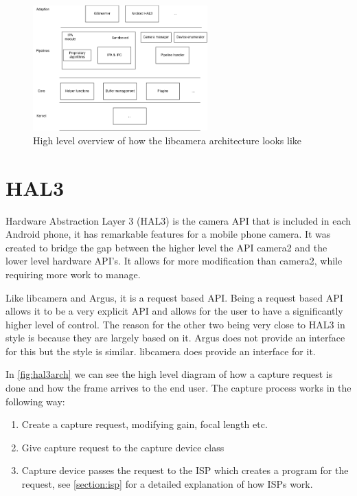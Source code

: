 \begin{figure}
    \begin{center}
        \includegraphics[width=0.60\textwidth]{figures/libcameraarch.png}
    \end{center}
    \caption{High level overview of how the libcamera architecture looks like}
    \label{fig:libcameraarch}
\end{figure}


\section{HAL3}
Hardware Abstraction Layer 3 (HAL3) is the camera API that is included in each
Android phone, it has remarkable features for a mobile phone camera. It was
created to bridge the gap between the higher level the API camera2 and the
lower level hardware API's. It allows for more modification than camera2, while
requiring more work to manage.

Like libcamera and Argus, it is a request based API. Being a request based API
allows it to be a very explicit API and allows for the user to have a
significantly higher level of control. The reason for the other
two being very close to HAL3 in style is because they are largely based on it.
Argus does not provide an interface for this but the style is similar. libcamera
does provide an interface for it.

In \cref{fig:hal3arch} we can see the high level diagram of how a capture
request is done and how the frame arrives to the end user. The capture process
works in the following way:

\begin{enumerate}
    \item Create a capture request, modifying gain, focal length etc.
    \item Give capture request to the capture device class
    \item Capture device passes the request to the ISP which creates a program
        for the request, see \cref{section:isp} for a detailed explanation of
        how ISPs work.

\end{enumerate}


